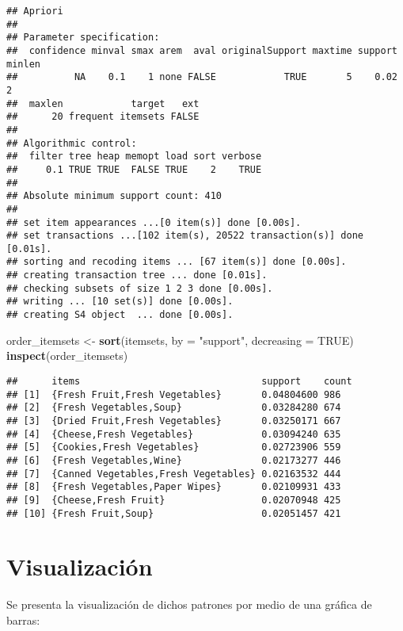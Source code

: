 \documentclass[]{article}
\newenvironment{Shaded}{\begin{snugshade}}{\end{snugshade}}
\newcommand{\KeywordTok}[1]{\textcolor[rgb]{0.13,0.29,0.53}{\textbf{#1}}}
\newcommand{\DataTypeTok}[1]{\textcolor[rgb]{0.13,0.29,0.53}{#1}}
\newcommand{\StringTok}[1]{\textcolor[rgb]{0.31,0.60,0.02}{#1}}
\newcommand{\OtherTok}[1]{\textcolor[rgb]{0.56,0.35,0.01}{#1}}
\newcommand{\NormalTok}[1]{#1}
\begin{document}
\begin{verbatim}
## Apriori
## 
## Parameter specification:
##  confidence minval smax arem  aval originalSupport maxtime support minlen
##          NA    0.1    1 none FALSE            TRUE       5    0.02      2
##  maxlen            target   ext
##      20 frequent itemsets FALSE
## 
## Algorithmic control:
##  filter tree heap memopt load sort verbose
##     0.1 TRUE TRUE  FALSE TRUE    2    TRUE
## 
## Absolute minimum support count: 410 
## 
## set item appearances ...[0 item(s)] done [0.00s].
## set transactions ...[102 item(s), 20522 transaction(s)] done [0.01s].
## sorting and recoding items ... [67 item(s)] done [0.00s].
## creating transaction tree ... done [0.01s].
## checking subsets of size 1 2 3 done [0.00s].
## writing ... [10 set(s)] done [0.00s].
## creating S4 object  ... done [0.00s].
\end{verbatim}

\begin{Shaded}
\begin{Highlighting}[]
\NormalTok{order_itemsets <-}\StringTok{ }\KeywordTok{sort}\NormalTok{(itemsets, }\DataTypeTok{by =} \StringTok{"support"}\NormalTok{, }\DataTypeTok{decreasing =} \OtherTok{TRUE}\NormalTok{)}
\KeywordTok{inspect}\NormalTok{(order_itemsets)}
\end{Highlighting}
\end{Shaded}

\begin{verbatim}
##      items                                support    count
## [1]  {Fresh Fruit,Fresh Vegetables}       0.04804600 986  
## [2]  {Fresh Vegetables,Soup}              0.03284280 674  
## [3]  {Dried Fruit,Fresh Vegetables}       0.03250171 667  
## [4]  {Cheese,Fresh Vegetables}            0.03094240 635  
## [5]  {Cookies,Fresh Vegetables}           0.02723906 559  
## [6]  {Fresh Vegetables,Wine}              0.02173277 446  
## [7]  {Canned Vegetables,Fresh Vegetables} 0.02163532 444  
## [8]  {Fresh Vegetables,Paper Wipes}       0.02109931 433  
## [9]  {Cheese,Fresh Fruit}                 0.02070948 425  
## [10] {Fresh Fruit,Soup}                   0.02051457 421
\end{verbatim}

\section{Visualización}\label{visualizacion}

Se presenta la visualización de dichos patrones por medio de una gráfica
de barras:
\end{document}
